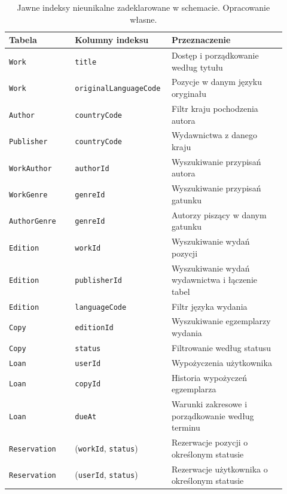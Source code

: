 \documentclass[11pt, a4paper]{article}
\begin{document}
\begin{table}[htbp]
\centering
\caption{Jawne indeksy nieunikalne zadeklarowane w schemacie. Opracowanie własne.}
\label{tab:indeksy-fizyczne}
\normalsize
\begin{tabular}{@{}p{0.23\linewidth}p{0.29\linewidth}p{0.40\linewidth}@{}}
\toprule
\textbf{Tabela} & \textbf{Kolumny indeksu} & \textbf{Przeznaczenie} \\
\midrule
\texttt{Work} & \texttt{title} & Dostęp i porządkowanie według tytułu \\
\texttt{Work} & \texttt{originalLanguageCode} & Pozycje w danym języku oryginału \\
\texttt{Author} & \texttt{countryCode} & Filtr kraju pochodzenia autora \\
\texttt{Publisher} & \texttt{countryCode} & Wydawnictwa z danego kraju \\
\texttt{WorkAuthor} & \texttt{authorId} & Wyszukiwanie przypisań autora \\
\texttt{WorkGenre} & \texttt{genreId} & Wyszukiwanie przypisań gatunku \\
\texttt{AuthorGenre} & \texttt{genreId} & Autorzy piszący w danym gatunku \\
\texttt{Edition} & \texttt{workId} & Wyszukiwanie wydań pozycji \\
\texttt{Edition} & \texttt{publisherId} & Wyszukiwanie wydań wydawnictwa i łączenie tabel \\
\texttt{Edition} & \texttt{languageCode} & Filtr języka wydania \\
\texttt{Copy} & \texttt{editionId} & Wyszukiwanie egzemplarzy wydania \\
\texttt{Copy} & \texttt{status} & Filtrowanie według statusu \\
\texttt{Loan} & \texttt{userId} & Wypożyczenia użytkownika \\
\texttt{Loan} & \texttt{copyId} & Historia wypożyczeń egzemplarza \\
\texttt{Loan} & \texttt{dueAt} & Warunki zakresowe i porządkowanie według terminu \\
\texttt{Reservation} & (\texttt{workId}, \texttt{status}) & Rezerwacje pozycji o określonym statusie \\
\texttt{Reservation} & (\texttt{userId}, \texttt{status}) & Rezerwacje użytkownika o określonym statusie \\
\bottomrule
\end{tabular}
\end{table}
\end{document}
